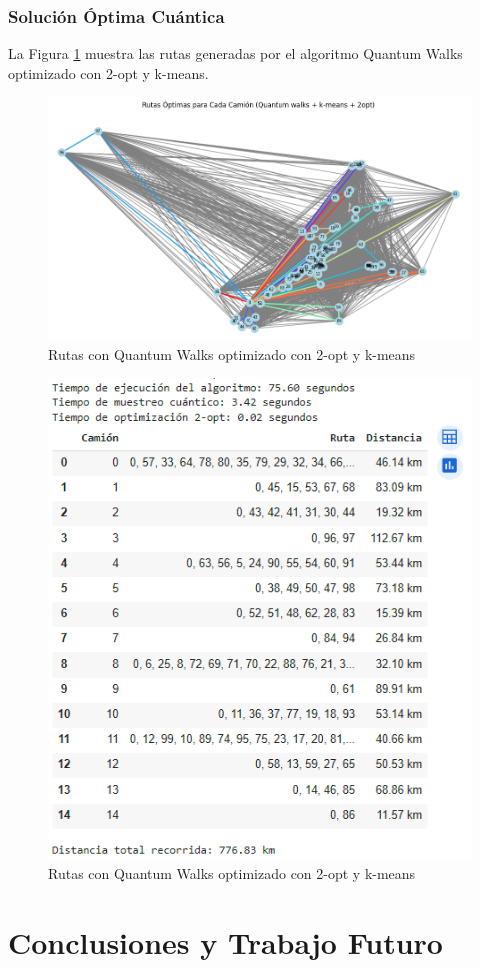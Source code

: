 \documentclass[11pt,a4paper,spanish]{book}
\begin{document}
\subsection{Solución Óptima Cuántica}

La Figura \ref{fig:solucionQW2opt} muestra las rutas generadas por el algoritmo Quantum Walks optimizado con 2-opt y k-means.

\begin{figure}[H]
\centering
\includegraphics[width=0.9\linewidth]{QW.png}
\caption{Rutas con Quantum Walks optimizado con 2-opt y k-means}
\label{fig:solucionQW2opt}
\end{figure}

\begin{figure}[H]
\centering
\includegraphics[width=0.6\linewidth]{TablaQW.png}
\caption{Rutas con Quantum Walks optimizado con 2-opt y k-means}
\label{fig:tablaQW}
\end{figure}

\chapter{Conclusiones y Trabajo Futuro}
\end{document}
